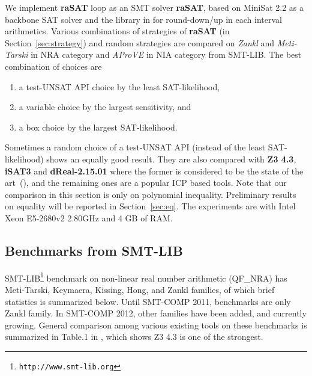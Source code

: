 \documentclass[runningheads,a4paper,oribibl]{llncs}
\begin{document}
We implement \textbf{raSAT} loop as an SMT solver {\bf raSAT}, 
based on MiniSat 2.2 as a backbone SAT solver and the library in \cite{Al2012.14} for
round-down/up in each interval arithmetics. 
Various combinations of strategies of {\bf raSAT} (in Section~\ref{sec:strategy})
and random strategies are compared on {\em Zankl} and {\em Meti-Tarski} in NRA category 
and {\em AProVE} in NIA category from SMT-LIB. 
The best combination of choices are 
\begin{enumerate}
\item a test-UNSAT API choice by the least SAT-likelihood, 
\item a variable choice by the largest sensitivity, and 
\item a box choice by the largest SAT-likelihood. 
\end{enumerate} 
Sometimes a random choice of a test-UNSAT API (instead of the least SAT-likelihood) 
shows an equally good result. 
They are also compared with \textbf{Z3 4.3}, \textbf{iSAT3} and \textbf{dReal-2.15.01}
where the former is considered to be the state of the art~(\cite{Jovanovic13}), and 
the remaining ones are a popular ICP based tools. 
Note that our comparison in this section is only on polynomial inequality.
Preliminary results on equality will be reported in Section~\ref{sec:eq}. 
The experiments are with Intel Xeon E5-2680v2 2.80GHz and 4 GB of RAM. 


\subsection{Benchmarks from SMT-LIB} \label{sec:expsmtlib}

SMT-LIB\footnote{\tt http://www.smt-lib.org} 
benchmark on non-linear real number arithmetic 
(QF\_NRA) has Meti-Tarski, Keymaera, Kissing, Hong, and Zankl families,
of which brief statistics is summarized below. 
Until SMT-COMP 2011, benchmarks are only Zankl family. 
In SMT-COMP 2012, other families have been added, and currently growing. 
General comparison among various existing tools on these benchmarks is summarized in 
Table.1 in \cite{Jovanovic13}, which shows Z3 4.3 is one of the strongest. 
\end{document}
